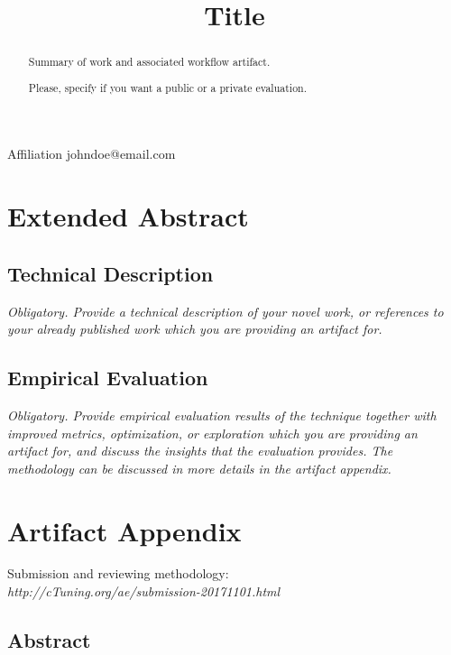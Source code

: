 \documentclass{sigplanconf}
\begin{document}

\title{Title}

{Affiliation}
{johndoe@email.com}

\maketitle

\begin{abstract}
Summary of work and associated workflow artifact.

Please, specify if you want a public or a private evaluation.
\end{abstract}

\section{Extended Abstract}

\subsection{Technical Description}
{\em Obligatory. Provide a technical description of your novel work, 
or references to your already published work which you are providing an artifact for.}

\subsection{Empirical Evaluation}
{\em Obligatory. Provide empirical evaluation results of the technique together with improved metrics, 
optimization, or exploration which you are providing an artifact for, and discuss the insights 
that the evaluation provides. The methodology can be discussed in more details in the artifact appendix.}

\newpage

\appendix
\section{Artifact Appendix}

Submission and reviewing methodology: \\
{\em http://cTuning.org/ae/submission-20171101.html}

\subsection{Abstract}
\end{document}
